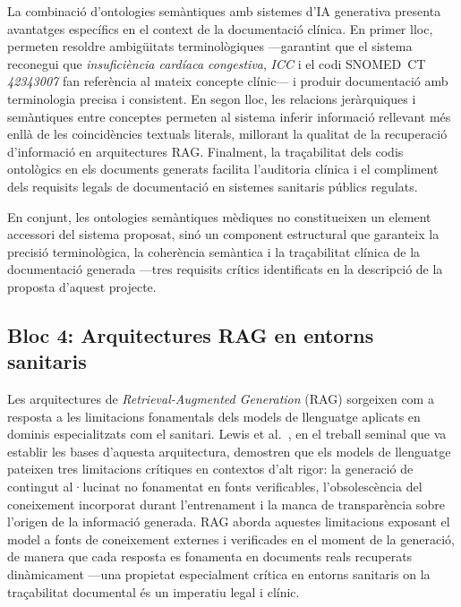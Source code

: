 \documentclass[11pt,a4paper]{article}
\begin{document}
La combinació d'ontologies semàntiques amb sistemes d'IA generativa presenta avantatges específics en el context de la documentació clínica. En primer lloc, permeten resoldre ambigüitats terminològiques ---garantint que el sistema reconegui que \textit{insuficiència cardíaca congestiva}, \textit{ICC} i el codi SNOMED~CT \textit{42343007} fan referència al mateix concepte clínic--- i produir documentació amb terminologia precisa i consistent. En segon lloc, les relacions jeràrquiques i semàntiques entre conceptes permeten al sistema inferir informació rellevant més enllà de les coincidències textuals literals, millorant la qualitat de la recuperació d'informació en arquitectures RAG. Finalment, la traçabilitat dels codis ontològics en els documents generats facilita l'auditoria clínica i el compliment dels requisits legals de documentació en sistemes sanitaris públics regulats.

En conjunt, les ontologies semàntiques mèdiques no constitueixen un element accessori del sistema proposat, sinó un component estructural que garanteix la precisió terminològica, la coherència semàntica i la traçabilitat clínica de la documentació generada ---tres requisits crítics identificats en la descripció de la proposta d'aquest projecte.

\subsection*{Bloc 4: Arquitectures RAG en entorns sanitaris}

Les arquitectures de \textit{Retrieval-Augmented Generation} 
(RAG) sorgeixen com a resposta a les limitacions fonamentals dels models de llenguatge aplicats en dominis especialitzats com el sanitari. Lewis et al.~\cite{lewis2020retrieval}, en el treball seminal que va establir les bases d'aquesta arquitectura, demostren que els models de llenguatge pateixen tres limitacions crítiques en contextos d'alt rigor: la generació de contingut al·lucinat no fonamentat en fonts verificables, l'obsolescència del coneixement incorporat durant l'entrenament i la manca de transparència sobre l'origen de la informació generada. RAG aborda aquestes limitacions exposant el model a fonts de coneixement externes i verificades en el moment de la generació, de manera que cada resposta es fonamenta en documents reals recuperats dinàmicament ---una propietat especialment crítica en entorns sanitaris on la traçabilitat documental és un imperatiu legal i clínic.
\end{document}
